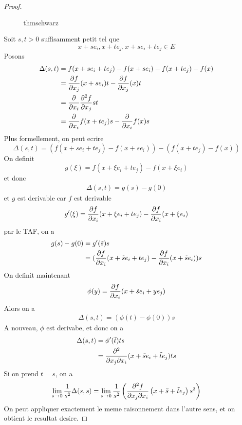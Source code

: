 \documentclass[../main.tex]{subfiles}
\begin{document}
\begin{proof}

\begin{figure}[H]
    \centering
    \caption{thmschwarz}
    \label{fig:thmschwarz}
\end{figure}
Soit $ s,t>0$ suffisamment petit tel que
\[ 
x+ se_i , x + te_j, x + se_i + te_j \in E
\]
Posons
\begin{align*}
	\Delta ( s,t)  &= f( x + s e_i + t e_j)  - f( x+ se_i)  - f( x+ t e_j ) + f( x) \\
		       &= \frac{\partial f}{\partial x_j}( x + s e_i ) t - \frac{\partial f}{\partial x_j} ( x) t \\
		       &= \frac{\partial }{\partial x_i} \frac{\partial ^{2} f}{\partial x_j} st\\
		       &= \frac{\partial }{\partial x_i} f( x+ te_j) s - \frac{\partial }{\partial x_i }f( x) s
\end{align*}
Plus formellement, on peut ecrire
\[ 
	\Delta ( s,t)  = ( f( x+ se_i + te_j)  - f( x+ se_i) ) - (  f( x+ te_j) - f( x) ) 
\]
On definit
\[ 
	g( \xi)  = f(  x+ \xi e_i + t e_j) - f( x+ \xi e_i) 
\]
et donc
\begin{align*}
	\Delta ( s,t) = g( s) - g( 0) 
\end{align*}
et $g$ est derivable car $f$ est derivable
\[ 
	g'( \xi) = \frac{\partial f}{\partial x_i} (  x+ \xi e_i + t e_j)  - \frac{\partial f}{\partial x_i} ( x+ \xi e_i) 
\]
par le TAF, on a
\begin{align*}
	g( s) - g( 0) &= g'( \tilde s)  s\\
		      &= ( \frac{\partial f}{\partial x_i}( x+ \tilde s e_i + t e_j)  - \frac{\partial f}{\partial x_i}( x+ \tilde s e_i) ) s\\
\end{align*}
On definit maintenant
\[ 
	\phi( y) = \frac{\partial f}{\partial x_i}( x+\tilde s e_i + y e_j) 
\]
Alors on a
\begin{align*}
	\Delta ( s,t) = ( \phi( t) - \phi( 0) ) s
\end{align*}
A nouveau, $\phi$ est derivabe, et donc on a 
\begin{align*}
	\Delta ( s,t) &= \phi'( \tilde t)  ts\\
		      &= \frac{\partial ^{2}}{\partial x_j \partial x_i} (  x+ \tilde s e_i + \tilde t e_j)  ts
\end{align*}
Si on prend $t=s$, on a
\begin{align*}
	\lim_{s \to 0} \frac{1}{s^{2}}\Delta ( s,s) = \lim_{s \to 0} \frac{1}{s^{2}} \left( \frac{\partial ^{2}f}{\partial x_j \partial x_i}\left(  x+ \tilde s + \tilde t e_j\right) s^{2}\right)
\end{align*}
On peut appliquer exactement le meme raisonnement dans l'autre sens, et on obtient le resultat desire.
\end{proof}
\end{document}
